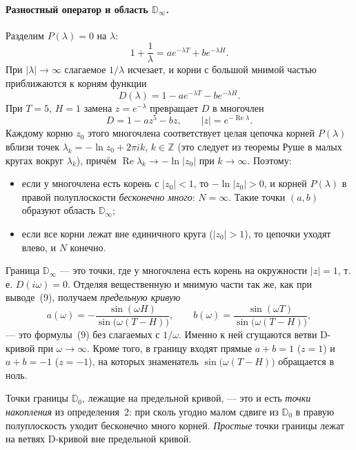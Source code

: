 \paragraph{Разностный оператор и область $\mathbb{D}_\infty$.}
Разделим $P(\lambda) = 0$ на $\lambda$:
\[
    1 + \frac{1}{\lambda} = a e^{-\lambda T} + b e^{-\lambda H}.
\]
При $|\lambda| \to \infty$ слагаемое $1/\lambda$ исчезает, и корни с большой мнимой частью
приближаются к корням функции
\[
    D(\lambda) = 1 - a e^{-\lambda T} - b e^{-\lambda H}.
\]
При $T = 5$, $H = 1$ замена $z = e^{-\lambda}$ превращает $D$ в многочлен
\[
    D = 1 - a z^5 - b z, \qquad |z| = e^{-\operatorname{Re}\lambda}.
\]
Каждому корню $z_0$ этого многочлена соответствует целая цепочка корней $P(\lambda)$ вблизи точек
$\lambda_k = -\ln z_0 + 2\pi i k$, $k \in \mathbb{Z}$ (это следует из теоремы Руше в малых кругах вокруг $\lambda_k$),
причём $\operatorname{Re}\lambda_k \to -\ln|z_0|$ при $k \to \infty$. Поэтому:
\begin{itemize}
    \item если у многочлена есть корень с $|z_0| < 1$, то $-\ln|z_0| > 0$, и корней $P(\lambda)$ в правой
    полуплоскости \emph{бесконечно много}: $N = \infty$. Такие точки $(a, b)$ образуют область $\mathbb{D}_\infty$;
    \item если все корни лежат вне единичного круга ($|z_0| > 1$), то цепочки уходят влево,
    и $N$ конечно.
\end{itemize}
Граница $\mathbb{D}_\infty$ --- это точки, где у многочлена есть корень на окружности $|z| = 1$, т.\,е.
$D(i\omega) = 0$. Отделяя вещественную и мнимую части так же, как при выводе~(9), получаем
\emph{предельную кривую}
\[
    a(\omega) = -\frac{\sin(\omega H)}{\sin\bigl(\omega(T - H)\bigr)}, \qquad
    b(\omega) = \frac{\sin(\omega T)}{\sin\bigl(\omega(T - H)\bigr)},
\]
--- это формулы~(9) без слагаемых с $1/\omega$. Именно к ней сгущаются ветви D-кривой при $\omega \to \infty$.
Кроме того, в границу входят прямые $a + b = 1$ ($z = 1$) и $a + b = -1$ ($z = -1$), на которых
знаменатель $\sin\bigl(\omega(T - H)\bigr)$ обращается в ноль.

Точки границы $\mathbb{D}_0$, лежащие на предельной кривой, --- это и есть \emph{точки накопления}
из определения~2: при сколь угодно малом сдвиге из $\mathbb{D}_0$ в правую полуплоскость уходит
бесконечно много корней. \emph{Простые} точки границы лежат на ветвях D-кривой вне предельной кривой.

